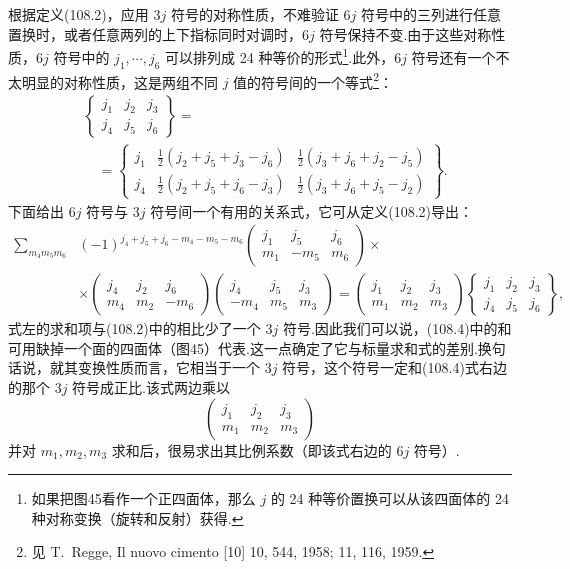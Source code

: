 根据定义(108.2)，应用 $3j$ 符号的对称性质，不难验证 $6j$ 符号中的三列进行任意置换时，或者任意两列的上下指标同时对调时，$6j$ 符号保持不变.由于这些对称性质，$6j$ 符号中的 $j_1,\cdots,j_6$ 可以排列成 24 种等价的形式\footnote{如果把图45看作一个正四面体，那么 $j$ 的 24 种等价置换可以从该四面体的 24 种对称变换（旋转和反射）获得.}.此外，$6j$ 符号还有一个不太明显的对称性质，这是两组不同 $j$ 值的符号间的一个等式\footnote{见 T.~Regge, Il nuovo cimento [10] 10, 544, 1958; 11, 116, 1959.}：
\begin{equation}
\begin{aligned}
  &\left\{\begin{array}{ccc}j_1&j_2&j_3\\j_4&j_5&j_6\end{array}\right\}=\\
  &\quad=\left\{\begin{array}{ccc}
  j_1 & \tfrac12(j_2+j_5+j_3-j_6) & \tfrac12(j_3+j_6+j_2-j_5)\\
  j_4 & \tfrac12(j_2+j_5+j_6-j_3) & \tfrac12(j_3+j_6+j_5-j_2)
  \end{array}\right\}.
\end{aligned}
\end{equation}
下面给出 $6j$ 符号与 $3j$ 符号间一个有用的关系式，它可从定义(108.2)导出：
\begin{equation}
\begin{aligned}
  \sum_{m_4m_5m_6}&(-1)^{j_4+j_5+j_6-m_4-m_5-m_6}
  \left(\begin{array}{ccc}j_1&j_5&j_6\\m_1&-m_5&m_6\end{array}\right)\times\\
  &\times\left(\begin{array}{ccc}j_4&j_2&j_6\\m_4&m_2&-m_6\end{array}\right)
  \left(\begin{array}{ccc}j_4&j_5&j_3\\-m_4&m_5&m_3\end{array}\right)
  =\left(\begin{array}{ccc}j_1&j_2&j_3\\m_1&m_2&m_3\end{array}\right)
  \left\{\begin{array}{ccc}j_1&j_2&j_3\\j_4&j_5&j_6\end{array}\right\},
\end{aligned}
\end{equation}
式左的求和项与(108.2)中的相比少了一个 $3j$ 符号.因此我们可以说，(108.4)中的和可用缺掉一个面的四面体（图45）代表.这一点确定了它与标量求和式的差别.换句话说，就其变换性质而言，它相当于一个 $3j$ 符号，这个符号一定和(108.4)式右边的那个 $3j$ 符号成正比.该式两边乘以
\begin{equation*}
  \left(\begin{array}{ccc}j_1&j_2&j_3\\m_1&m_2&m_3\end{array}\right)
\end{equation*}
并对 $m_1,m_2,m_3$ 求和后，很易求出其比例系数（即该式右边的 $6j$ 符号）.

